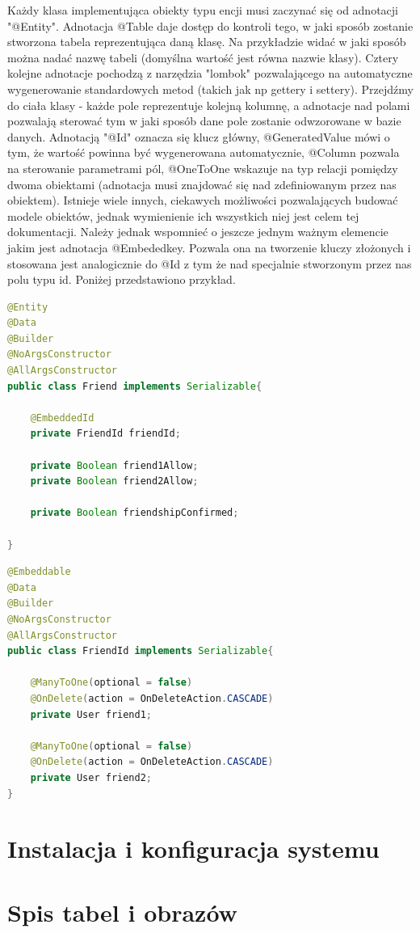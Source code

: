 \documentclass{report}
\begin{document}
		Każdy klasa implementująca obiekty typu encji musi zaczynać się od adnotacji "@Entity". Adnotacja @Table daje dostęp do kontroli tego, w jaki sposób zostanie stworzona tabela reprezentująca daną klasę. Na przykładzie widać w jaki sposób można nadać nazwę tabeli (domyślna wartość jest równa nazwie klasy). Cztery kolejne adnotacje pochodzą z narzędzia "lombok" pozwalającego na automatyczne wygenerowanie standardowych metod (takich jak np gettery i settery). Przejdźmy do ciała klasy - każde pole reprezentuje kolejną kolumnę, a adnotacje nad polami pozwalają sterować tym w jaki sposób dane pole zostanie odwzorowane w bazie danych. Adnotacją "@Id" oznacza się klucz główny, @GeneratedValue mówi o tym, że wartość powinna być wygenerowana automatycznie, @Column pozwala na sterowanie parametrami pól, @OneToOne wskazuje na typ relacji pomiędzy dwoma obiektami (adnotacja musi znajdować się nad zdefiniowanym przez nas obiektem). Istnieje wiele innych, ciekawych możliwości pozwalających budować modele obiektów, jednak wymienienie ich wszystkich niej jest celem tej dokumentacji. Należy jednak wspomnieć o jeszcze jednym ważnym elemencie jakim jest adnotacja @Embededkey. Pozwala ona na tworzenie kluczy złożonych i stosowana jest analogicznie do @Id z tym że nad specjalnie stworzonym przez nas polu typu id. Poniżej przedstawiono przykład.


		\begin{lstlisting}[language=Java, breaklines]
@Entity
@Data
@Builder
@NoArgsConstructor
@AllArgsConstructor
public class Friend implements Serializable{

    @EmbeddedId
    private FriendId friendId;

    private Boolean friend1Allow;
    private Boolean friend2Allow;

    private Boolean friendshipConfirmed;

}
		\end{lstlisting}

		\begin{lstlisting}[language=Java, breaklines]
@Embeddable
@Data
@Builder
@NoArgsConstructor
@AllArgsConstructor
public class FriendId implements Serializable{

    @ManyToOne(optional = false)
    @OnDelete(action = OnDeleteAction.CASCADE)
    private User friend1;

    @ManyToOne(optional = false)
    @OnDelete(action = OnDeleteAction.CASCADE)
    private User friend2;
}
		\end{lstlisting}


\chapter{Instalacja i konfiguracja systemu}


\chapter{Spis tabel i obrazów}


\begingroup
\let\clearpage\relax
\listoffigures
\listoftables
\endgroup
\end{document}
